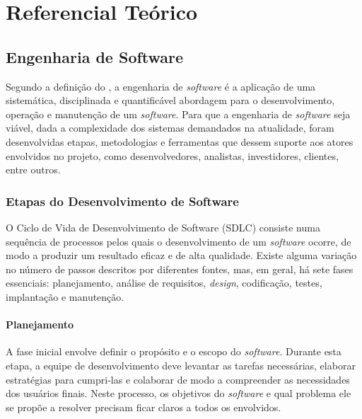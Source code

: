 

\chapter{Referencial Teórico}\label{cap:fundamentacao}

\section{Engenharia de Software}
Segundo a definição do \citet{159342}, a engenharia de \emph{software} é a aplicação de uma sistemática, disciplinada e quantificável abordagem para o desenvolvimento, operação e manutenção de um \emph{software}. Para que a engenharia de \emph{software} seja viável, dada a complexidade dos sistemas demandados na atualidade, foram desenvolvidas etapas, metodologias e ferramentas que dessem suporte aos atores envolvidos no projeto, como desenvolvedores, analistas, investidores, clientes, entre outros.

\subsection{Etapas do Desenvolvimento de Software}
O Ciclo de Vida de Desenvolvimento de Software (SDLC) consiste numa sequência de processos pelos quais o desenvolvimento de um \emph{software} ocorre, de modo a produzir um resultado eficaz e de alta qualidade. Existe alguma variação no número de passos descritos por diferentes fontes, mas, em geral, há sete fases essenciais: planejamento, análise de requisitos, \emph{design}, codificação, testes, implantação e manutenção.

\subsubsection{Planejamento}

A fase inicial envolve definir o propósito e o escopo do \emph{software}. Durante esta etapa, a equipe de desenvolvimento deve levantar as tarefas necessárias, elaborar estratégias para cumpri-las e colaborar de modo a compreender as necessidades dos usuários finais. Neste processo, os objetivos do \emph{software} e qual problema ele se propõe a resolver precisam ficar claros a todos os envolvidos.

